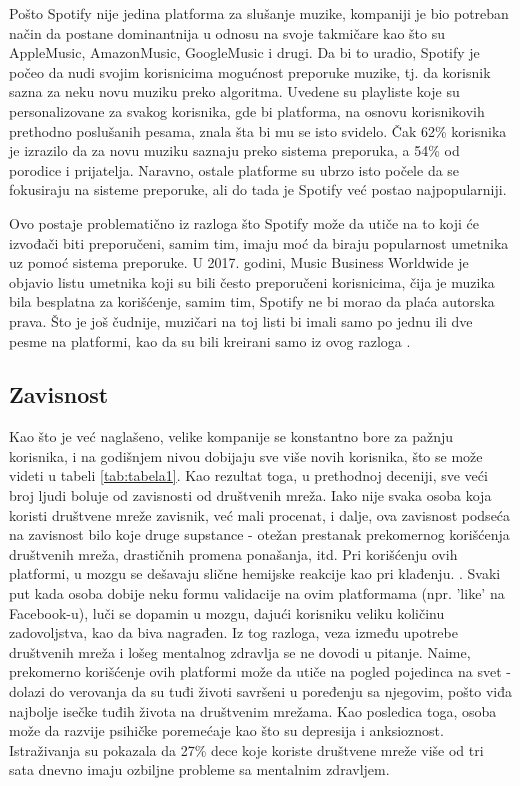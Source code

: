 \documentclass[a4paper]{article}
\begin{document}
Pošto Spotify nije jedina platforma za slušanje muzike, kompaniji je bio potreban način da postane dominantnija u odnosu na svoje takmičare kao što su AppleMusic, AmazonMusic, GoogleMusic i drugi. Da bi to uradio, Spotify je počeo da nudi svojim korisnicima mogućnost preporuke muzike, tj. da korisnik sazna za neku novu muziku preko algoritma. Uvedene su playliste koje su personalizovane za svakog korisnika, gde bi platforma, na osnovu korisnikovih prethodno poslušanih pesama, znala šta bi mu se isto svidelo. 
Čak 62\% korisnika je izrazilo da za novu muziku saznaju preko sistema preporuka, a 54\% od porodice i prijatelja. Naravno, ostale platforme su ubrzo isto počele da se fokusiraju na sisteme preporuke, ali do tada je Spotify već postao najpopularniji. 

Ovo postaje problematično iz razloga što Spotify može da utiče na to koji će izvođači biti preporučeni, samim tim, imaju moć da biraju popularnost umetnika uz pomoć sistema preporuke. U 2017. godini, Music Business Worldwide je objavio listu umetnika koji su bili često preporučeni korisnicima, čija je muzika bila besplatna za korišćenje, samim tim, Spotify ne bi morao da plaća autorska prava. Što je još čudnije, muzičari na toj listi bi imali samo po jednu ili dve pesme na platformi, kao da su bili kreirani samo iz ovog razloga \cite{spotify}.

 

\subsection{Zavisnost}
Kao što je već naglašeno, velike kompanije se konstantno bore za pažnju korisnika, i na godišnjem nivou dobijaju sve više novih korisnika, što se može videti u tabeli \ref{tab:tabela1}. Kao rezultat toga, u prethodnoj deceniji, sve veći broj ljudi boluje od zavisnosti od društvenih mreža. Iako nije svaka osoba koja koristi društvene mreže zavisnik, već mali procenat, i dalje, ova zavisnost podseća na zavisnost bilo koje druge supstance - otežan prestanak prekomernog korišćenja društvenih mreža, drastičnih promena ponašanja, itd. Pri korišćenju ovih platformi, u mozgu se dešavaju slične hemijske reakcije kao pri klađenju. \cite{zavisnost}. Svaki put kada osoba dobije neku formu validacije na ovim platformama (npr. 'like' na Facebook-u), luči se dopamin u mozgu, dajući korisniku veliku količinu zadovoljstva, kao da biva nagrađen. Iz tog razloga, veza između upotrebe društvenih mreža i lošeg mentalnog zdravlja se ne dovodi u pitanje. Naime, prekomerno korišćenje ovih platformi može da utiče na pogled pojedinca na svet - dolazi do verovanja da su tuđi životi savršeni u poređenju sa njegovim, pošto viđa najbolje isečke tuđih života na društvenim mrežama. Kao posledica toga, osoba može da razvije psihičke poremećaje kao što su depresija i anksioznost. Istraživanja su pokazala da 27\% dece koje koriste društvene mreže više od tri sata dnevno imaju ozbiljne probleme sa mentalnim zdravljem.
\end{document}

